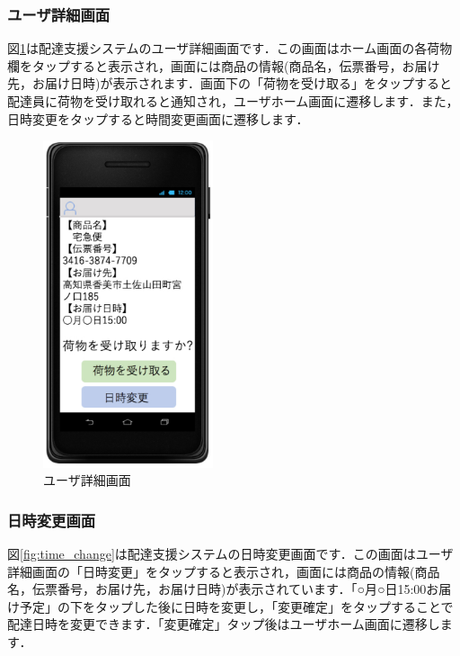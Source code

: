 \documentclass[a4j,titlepage]{jarticle}
\begin{document}
\subsubsection{ユーザ詳細画面}
図\ref{fig:user_details}は配達支援システムのユーザ詳細画面です．この画面はホーム画面の各荷物欄をタップすると表示され，画面には商品の情報(商品名，伝票番号，お届け先，お届け日時)が表示されます．画面下の「荷物を受け取る」をタップすると配達員に荷物を受け取れると通知され，ユーザホーム画面に遷移します．また，日時変更をタップすると時間変更画面に遷移します．
\begin{figure}[htbp]
 \begin{center}
  \includegraphics[width=50mm]{user_details}
	\caption{ユーザ詳細画面}
	\label{fig:user_details}
 \end{center}

\end{figure}

\subsubsection{日時変更画面}
図\ref{fig:time_change}は配達支援システムの日時変更画面です．この画面はユーザ詳細画面の「日時変更」をタップすると表示され，画面には商品の情報(商品名，伝票番号，お届け先，お届け日時)が表示されています．「○月○日15:00お届け予定」の下をタップした後に日時を変更し，「変更確定」をタップすることで配達日時を変更できます．「変更確定」タップ後はユーザホーム画面に遷移します．
\end{document}
